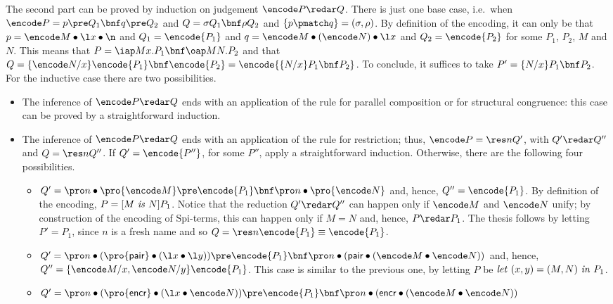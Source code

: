 \documentclass{LMCS}
\begin{document}
The second part can be proved by induction on judgement $\encode P \redar Q$.
There is just one base case, i.e.\ when $\encode P = p \pre Q_1\bnf q \pre Q_2$ and
$Q = \sigma Q_1\bnf \rho Q_2$ and $\{p\pmatch q\} = (\sigma, \rho)$.
By definition of the encoding, it can only be that
$p= \encode M\bullet\l x\bullet \n$ and $Q_1 = \encode {P_1}$ and
$q = \encode M\bullet (\encode N)\bullet \l x$ and $Q_2 = \encode {P_2}$
for some $P_1$, $P_2$, $M$ and $N$. This means that $P = \iap M x.P_1\bnf \oap M N . P_2$
and that $Q = \{\encode N/x\}\encode{P_1}\bnf\encode{P_2} = \encode{\{N/x\}P_1\bnf P_2}$.
To conclude, it suffices to take $P' = \{N/x\}P_1\bnf P_2$.
For the inductive case there are two possibilities.
\begin{itemize}
	\item The inference of $\encode P \redar Q$ ends with an application of the rule for
				parallel composition or for structural congruence: this case can be proved by a
				straightforward induction.
	\item The inference of $\encode P \redar Q$ ends with an application of the rule for restriction;
				thus, $\encode P = \res n Q'$, with $Q' \redar Q''$ and $Q = \res n Q''$.
				If $Q' = \encode {P''}$, for some $P''$, apply a straightforward induction.
				Otherwise, there are the following four possibilities.
				\begin{itemize}
					\item $Q' = \pro n\bullet\pro{\encode M}\pre\encode{P_1}\bnf\pro n\bullet\pro{\encode N}$
								and, hence, $Q'' = \encode{P_1}$. By definition of the encoding, 
								$P = [M\ {\it is}\ N] P_1$. Notice that the reduction $Q' \redar Q''$ can happen only if
								$\encode M$ and $\encode N$ unify; by construction of the encoding of Spi-terms,
								this can happen only if $M = N$ and, hence, $P \redar P_1$.
								The thesis follows by letting $P' = P_1$, since $n$ is a fresh name and so
								$Q = \res n \encode {P_1} \equiv \encode {P_1}$.
					\item $Q' =\pro n\bullet(\pro{{\sf pair}}\bullet(\l x\bullet\l y))\pre\encode{P_1}
								\bnf\pro n\bullet({\sf pair}\bullet(\encode M\bullet\encode N))$
								and, hence, $Q'' = \{\encode M/x,\encode N/y\}\encode{P_1}$. 
								This case is similar to the previous one, by letting $P$ be
								${\it let}\ (x,y)= (M,N)\ {\it in}\ P_1$.
					\item $Q' = \pro n\bullet (\pro {{\sf encr}}\bullet(\l x\bullet \encode N))\pre \encode {P_1}
								\bnf \pro n\bullet ({\sf encr}\bullet (\encode M \bullet \encode N))$

\end{itemize}
\end{itemize}
\end{document}
